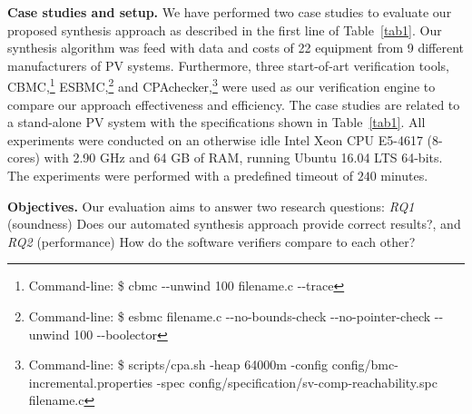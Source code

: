 \documentclass[10pt,conference]{IEEEtran}
\begin{document}
\textbf{Case studies and setup.} We have performed two case studies to evaluate our proposed synthesis approach as described in the first line of Table~\ref{tab1}. Our synthesis algorithm was feed with data and costs of 22 equipment from 9 different manufacturers of PV systems. Furthermore, three start-of-art verification tools, CBMC,\footnote{Command-line: \$ cbmc -\phantom{}-unwind 100 filename.c -\phantom{}-trace} ESBMC,\footnote{Command-line: \$ esbmc filename.c -\phantom{}-no-bounds-check -\phantom{}-no-pointer-check -\phantom{}-unwind 100 -\phantom{}-boolector} %
and CPAchecker,\footnote{Command-line: \$ scripts/cpa.sh -heap 64000m -config config/bmc-incremental.properties -spec config/specification/sv-comp-reachability.spc filename.c} were used as our verification engine to compare our approach effectiveness and efficiency. 
The case studies are related to a stand-alone PV system with the specifications shown in Table~\ref{tab1}. All experiments were conducted on an otherwise idle Intel Xeon CPU E5-4617 (8-cores) with 2.90 GHz and 64 GB of RAM, running Ubuntu 16.04 LTS 64-bits. 
The experiments were performed with a predefined timeout of $240$ minutes.

\textbf{Objectives.} Our evaluation aims to answer two research questions: \textit{RQ1} (soundness) Does our automated synthesis approach provide correct results?, and \textit{RQ2} (performance) How do the software verifiers compare to each other?
\end{document}
